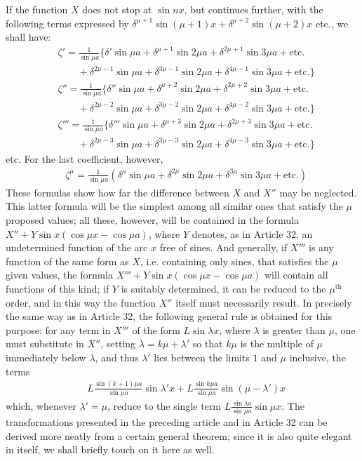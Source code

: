 \begingroup
\renewcommand{\arraystretch}{1.45}
If the function $X$ does not stop at $\sin nx$, but continues further, with the following terms expressed by $\delta^{\mu+1}\sin(\mu+1)x+\delta^{\mu+2}\sin(\mu+2)x$ etc., we shall have:
\[
\begin{aligned}
&\zeta'={}\frac{1}{\sin\mu a}\{\delta'\sin\mu a+\delta^{\mu+1}\sin 2\mu a+\delta^{2\mu+1}\sin 3\mu a+\text{etc.}\\[5pt]
&\qquad+\delta^{2\mu-1}\sin\mu a+\delta^{3\mu-1}\sin 2\mu a+\delta^{4\mu-1}\sin 3\mu a+\text{etc.}\}\\[5pt]
&\zeta''={}\frac{1}{\sin\mu a}\{\delta''\sin\mu a+\delta^{\mu+2}\sin 2\mu a+\delta^{2\mu+2}\sin 3\mu a+\text{etc.}\\[5pt]
&\qquad+\delta^{2\mu-2}\sin\mu a+\delta^{3\mu-2}\sin 2\mu a+\delta^{4\mu-2}\sin 3\mu a+\text{etc.}\}\\[5pt]
&\zeta'''={}\frac{1}{\sin\mu a}\{\delta'''\sin\mu a+\delta^{\mu+3}\sin 2\mu a+\delta^{2\mu+3}\sin 3\mu a+\text{etc.}\\[5pt]
&\qquad+\delta^{2\mu-3}\sin\mu a+\delta^{3\mu-3}\sin 2\mu a+\delta^{4\mu-3}\sin 3\mu a+\text{etc.}\}
\end{aligned}
\]
etc. For the last coefficient, however,
\[
\begin{aligned}
&\zeta^{\mu}=\frac{1}{\sin\mu a}(\delta^{\mu}\sin\mu a+\delta^{2\mu}\sin 2\mu a+\delta^{3\mu}\sin 3\mu a+\text{etc.})
\end{aligned}
\]
These formulas show how far the difference between $X$ and $X''$ may be neglected. This latter formula will be the simplest among all similar ones that satisfy the $\mu$ proposed values; all these, however, will be contained in the formula $X''+Y\sin x(\cos\mu x-\cos\mu a)$, where $Y$ denotes, as in Article 32, an undetermined function of the arc $x$ free of sines. And generally, if $X'''$ is any function of the same form as $X$, i.e. containing only sines, that satisfies the $\mu$ given values, the formula $X'''+Y\sin x(\cos\mu x-\cos\mu a)$ will contain all functions of this kind; if $Y$ is suitably determined, it can be reduced to the $\mu^{\mathrm{th}}$ order, and in this way the function $X''$ itself must necessarily result. In precisely the same way as in Article 32, the following general rule is obtained for this purpose: for any term in $X'''$ of the form $L\sin\lambda x$, where $\lambda$ is greater than $\mu$, one must substitute in $X''$, setting $\lambda=k\mu+\lambda'$ so that $k\mu$ is the multiple of $\mu$ immediately below $\lambda$, and thus $\lambda'$ lies between the limits $1$ and $\mu$ inclusive, the terms
\[
\begin{aligned}
&L\frac{\sin(k+1)\mu a}{\sin\mu a}\sin\lambda'x+L\frac{\sin k\mu a}{\sin\mu a}\sin(\mu-\lambda')x
\end{aligned}
\]
which, whenever $\lambda'=\mu$, reduce to the single term $L\frac{\sin\lambda a}{\sin\mu a}\sin\mu x$.
The transformations presented in the preceding article and in Article 32 can be derived more neatly from a certain general theorem; since it is also quite elegant in itself, we shall briefly touch on it here as well.

